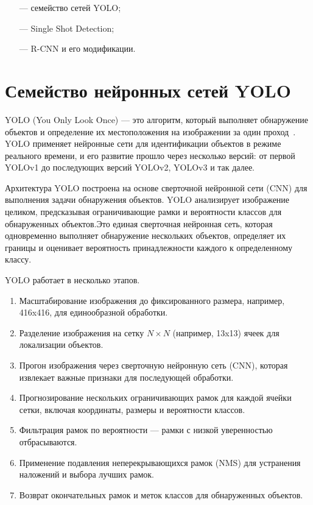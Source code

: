 \begin{itemize}
    \item[---] семейство сетей YOLO;
    \item[---] Single Shot Detection;
    \item[---] R-CNN и его модификации.
\end{itemize}

\clearpage

\section{Семейство нейронных сетей YOLO}

YOLO (You Only Look Once) — это алгоритм, который выполняет обнаружение объектов и определение их местоположения на изображении за один проход~\cite{yolo}. YOLO применяет нейронные сети для идентификации объектов в режиме реального времени, и его развитие прошло через несколько версий: от первой YOLOv1 до последующих версий YOLOv2, YOLOv3 и так далее.

Архитектура YOLO построена на основе сверточной нейронной сети (CNN) для выполнения задачи обнаружения объектов. YOLO анализирует изображение целиком, предсказывая ограничивающие рамки и вероятности классов для обнаруженных объектов.Это единая сверточная нейронная сеть, которая одновременно выполняет обнаружение нескольких объектов, определяет их границы и оценивает вероятность принадлежности каждого к определенному классу.

YOLO работает в несколько этапов.
\begin{enumerate}
    \item Масштабирование изображения до фиксированного размера, например, 416x416, для единообразной обработки.
    \item Разделение изображения на сетку $N \times N$ (например, 13x13) ячеек для локализации объектов.
    \item Прогон изображения через сверточную нейронную сеть (CNN), которая извлекает важные признаки для последующей обработки.
    \item Прогнозирование нескольких ограничивающих рамок для каждой ячейки сетки, включая координаты, размеры и вероятности классов.
    \item Фильтрация рамок по вероятности — рамки с низкой уверенностью отбрасываются.
    \item Применение подавления неперекрывающихся рамок (NMS) для устранения наложений и выбора лучших рамок.
    \item Возврат окончательных рамок и меток классов для обнаруженных объектов.
\end{enumerate}

